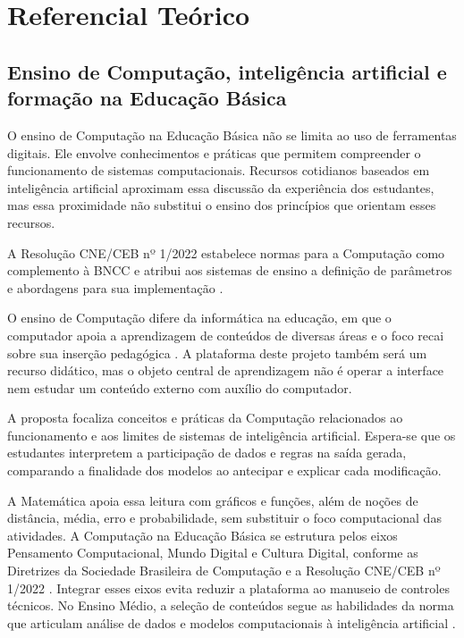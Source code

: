\chapter{Referencial Teórico}

\section{Ensino de Computação, inteligência artificial e formação na Educação Básica}

O ensino de Computação na Educação Básica não se limita ao uso de ferramentas digitais. Ele envolve conhecimentos e práticas que permitem compreender o funcionamento de sistemas computacionais. Recursos cotidianos baseados em inteligência artificial aproximam essa discussão da experiência dos estudantes, mas essa proximidade não substitui o ensino dos princípios que orientam esses recursos.

A Resolução CNE/CEB nº 1/2022 estabelece normas para a Computação como complemento à BNCC e atribui aos sistemas de ensino a definição de parâmetros e abordagens para sua implementação \cite{brasil2022computacao}.

O ensino de Computação difere da informática na educação, em que o computador apoia a aprendizagem de conteúdos de diversas áreas e o foco recai sobre sua inserção pedagógica \cite{valente2002uso}. A plataforma deste projeto também será um recurso didático, mas o objeto central de aprendizagem não é operar a interface nem estudar um conteúdo externo com auxílio do computador.

A proposta focaliza conceitos e práticas da Computação relacionados ao funcionamento e aos limites de sistemas de inteligência artificial. Espera-se que os estudantes interpretem a participação de dados e regras na saída gerada, comparando a finalidade dos modelos ao antecipar e explicar cada modificação.

A Matemática apoia essa leitura com gráficos e funções, além de noções de distância, média, erro e probabilidade, sem substituir o foco computacional das atividades. A Computação na Educação Básica se estrutura pelos eixos Pensamento Computacional, Mundo Digital e Cultura Digital, conforme as Diretrizes da Sociedade Brasileira de Computação e a Resolução CNE/CEB nº 1/2022 \cite{sbc2018diretrizes,brasil2022computacao}. Integrar esses eixos evita reduzir a plataforma ao manuseio de controles técnicos. No Ensino Médio, a seleção de conteúdos segue as habilidades da norma que articulam análise de dados e modelos computacionais à inteligência artificial \cite{brasil2022computacao}.

